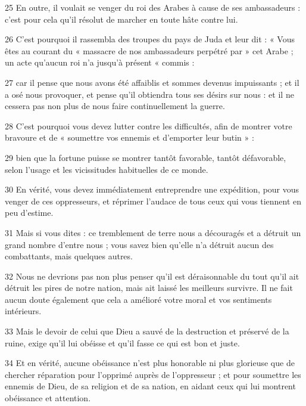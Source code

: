 \par 25 En outre, il voulait se venger du roi des Arabes à cause de ses ambassadeurs : c'est pour cela qu'il résolut de marcher en toute hâte contre lui.

\par 26 C'est pourquoi il rassembla des troupes du pays de Juda et leur dit : « Vous êtes au courant du « massacre de nos ambassadeurs perpétré par » cet Arabe ; un acte qu’aucun roi n’a jusqu’à présent « commis :

\par 27 car il pense que nous avons été affaiblis et sommes devenus impuissants ; et il a osé nous provoquer, et pense qu'il obtiendra tous ses désirs sur nous : et il ne cessera pas non plus de nous faire continuellement la guerre.

\par 28 C'est pourquoi vous devez lutter contre les difficultés, afin de montrer votre bravoure et de « soumettre vos ennemis et d'emporter leur butin » :

\par 29 bien que la fortune puisse se montrer tantôt favorable, tantôt défavorable, selon l'usage et les vicissitudes habituelles de ce monde.

\par 30 En vérité, vous devez immédiatement entreprendre une expédition, pour vous venger de ces oppresseurs, et réprimer l'audace de tous ceux qui vous tiennent en peu d'estime.

\par 31 Mais si vous dites : ce tremblement de terre nous a découragés et a détruit un grand nombre d'entre nous ; vous savez bien qu'elle n'a détruit aucun des combattants, mais quelques autres.

\par 32 Nous ne devrions pas non plus penser qu'il est déraisonnable du tout qu'il ait détruit les pires de notre nation, mais ait laissé les meilleurs survivre. Il ne fait aucun doute également que cela a amélioré votre moral et vos sentiments intérieurs.

\par 33 Mais le devoir de celui que Dieu a sauvé de la destruction et préservé de la ruine, exige qu'il lui obéisse et qu'il fasse ce qui est bon et juste.

\par 34 Et en vérité, aucune obéissance n'est plus honorable ni plus glorieuse que de chercher réparation pour l'opprimé auprès de l'oppresseur ; et pour soumettre les ennemis de Dieu, de sa religion et de sa nation, en aidant ceux qui lui montrent obéissance et attention.

